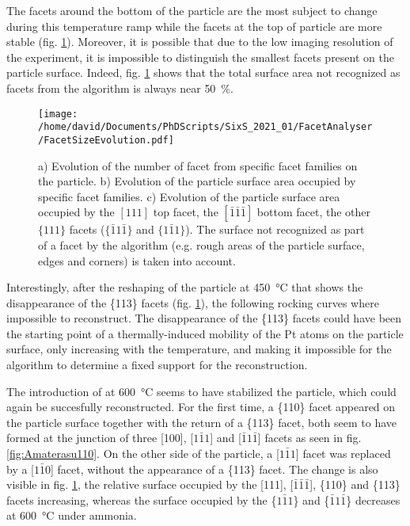 The facets around the bottom of the particle are the most subject to change during this temperature ramp while the facets at the top of particle are more stable (fig. \ref{fig:AmaterasuFacetsEvolution}).
Moreover, it is possible that due to the low imaging resolution of the experiment, it is impossible to distinguish the smallest facets present on the particle surface.
Indeed, fig. \ref{fig:AmaterasuFacetsEvolution} shows that the total surface area not recognized as facets from the algorithm is always near \qty{50}{\percent}.

\begin{figure}[!htb]
    \centering
    \texttt{[image: /home/david/Documents/PhDScripts/SixS\_2021\_01/FacetAnalyser/FacetSizeEvolution.pdf]}
    \caption{
        a) Evolution of the number of facet from specific facet families on the particle.
        b) Evolution of the particle surface area occupied by specific facet families.
        c) Evolution of the particle surface area occupied by the $[111]$ top facet, the $[\bar{1}\bar{1}\bar{1}]$ bottom facet, the other $\{111\}$ facets ($\{\bar{1}1\bar{1}\}$ and $\{1\bar{1}1\}$).
        The surface not recognized as part of a facet by the algorithm (e.g. rough areas of the particle surface, edges and corners) is taken into account.
    }
    \label{fig:AmaterasuFacetsEvolution}
\end{figure}

Interestingly, after the reshaping of the particle at \qty{450}{\degreeCelsius} that shows the disappearance of the \{113\} facets (fig. \ref{fig:AmaterasuFacetsEvolution}), the following rocking curves where impossible to reconstruct.
The disappearance of the \{113\} facets could have been the starting point of a thermally-induced mobility of the Pt atoms on the particle surface, only increasing with the temperature, and making it impossible for the algorithm to determine a fixed support for the reconstruction.

The introduction of \ammonia at \qty{600}{\degreeCelsius} seems to have stabilized the particle, which could again be succesfully reconstructed.
For the first time, a \{110\} facet appeared on the particle surface together with the return of a \{113\} facet, both seem to have formed at the junction of three [100], [$1\bar{1}1$] and [$\bar{1}1\bar{1}$] facets as seen in fig. \ref{fig:Amaterasu110}.
On the other side of the particle, a [$1\bar{1}1$] facet was replaced by a [$1\bar{1}0$] facet, without the appearance of a \{113\} facet.
The change is also visible in fig. \ref{fig:AmaterasuFacetsEvolution}, the relative surface occupied by the [111], [$\bar{1}\bar{1}\bar{1}$], \{110\} and \{113\} facets increasing, whereas the surface occupied by the \{$1\bar{1}1$\} and \{$\bar{1}1\bar{1}$\} decreases at \qty{600}{\degreeCelsius} under ammonia.

